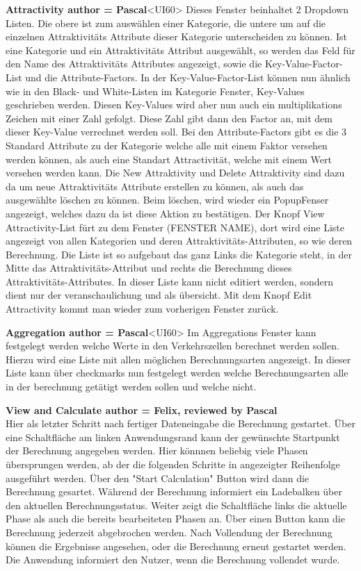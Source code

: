 \documentclass[parskip=full]{scrartcl} %
\begin{document}
\textbf{Attractivity author = Pascal}<UI60>
Dieses Fenster beinhaltet 2 Dropdown Listen. Die obere ist zum auswählen einer Kategorie, die untere um auf die einzelnen Attraktivitäts Attribute dieser Kategorie unterscheiden zu können.
Ist eine Kategorie und ein Attraktivitäts Attribut ausgewählt, so werden das Feld für den Name des Attraktivitäts Attributes angezeigt, sowie die Key-Value-Factor-List und die Attribute-Factors.
In der Key-Value-Factor-List können nun ähnlich wie in den Black- und White-Listen im Kategorie Fenster, Key-Values geschrieben werden. Diesen Key-Values wird aber nun auch ein multiplikations Zeichen mit einer Zahl gefolgt. Diese Zahl gibt dann den Factor an, mit dem dieser Key-Value verrechnet werden soll.
Bei den Attribute-Factors gibt es die 3 Standard Attribute zu der Kategorie welche alle mit einem Faktor versehen werden können, als auch eine Standart Attractivität, welche mit einem Wert versehen werden kann.
Die New Attraktivity und Delete Attraktivity sind dazu da um neue Attraktivitäts Attribute erstellen zu können, als auch das ausgewählte löschen zu können. Beim löschen, wird wieder ein PopupFenser angezeigt, welches dazu da ist diese Aktion zu bestätigen.
Der Knopf View Attractivity-List fürt zu dem Fenster (FENSTER NAME), dort wird eine Liste angezeigt von allen Kategorien und deren Attraktivitäts-Attributen, so wie deren Berechnung.
Die Liste ist so aufgebaut das ganz Links die Kategorie steht, in der Mitte das Attraktivitäts-Attribut und rechts die Berechnung dieses Attraktivitäts-Attributes.
In dieser Liste kann nicht editiert werden, sondern dient nur der veranschaulichung und als übersicht.
Mit dem Knopf Edit Attractivity kommt man wieder zum vorherigen Fenster zurück.

\textbf{Aggregation author = Pascal}<UI60>
Im Aggregations Fenster kann festgelegt werden welche Werte in den Verkehrszellen berechnet werden sollen. Hierzu wird eine Liste mit allen möglichen Berechnungsarten angezeigt. In dieser Liste kann über checkmarks nun festgelegt werden welche Berechnungsarten alle in der berechnung getätigt werden sollen und welche nicht.

\textbf{View and Calculate author = Felix, reviewed by Pascal}\\
Hier als letzter Schritt nach fertiger Dateneingabe die Berechnung gestartet. Über eine Schaltfläche am linken Anwendungsrand kann der gewünschte Startpunkt der Berechnung angegeben werden. Hier könnnen beliebig viele Phasen übersprungen werden, ab der die folgenden Schritte in angezeigter Reihenfolge ausgeführt werden. Über den "Start Calculation" Button wird dann die Berechnung gesartet.
Während der Berechnung informiert ein Ladebalken über den aktuellen Berechnungsstatus. Weiter zeigt die Schaltfläche links die aktuelle Phase als auch die bereits bearbeiteten Phasen an. Über einen Button kann die Berechnung jederzeit abgebrochen werden.
Nach Vollendung der Berechnung können die Ergebnisse angesehen, oder die Berechnung erneut gestartet werden.
Die Anwendung informiert den Nutzer, wenn die Berechnung vollendet wurde.
\end{document}
